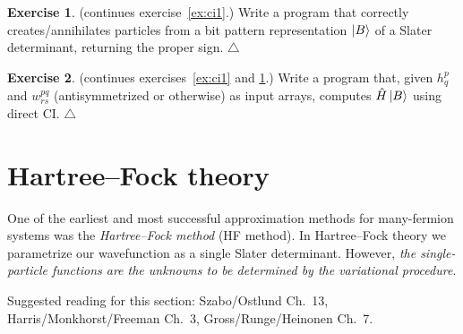 \documentclass{report}
\theoremstyle{plain}
\theoremstyle{definition}
\newtheorem{exerc}{Exercise}[chapter]
\newcommand\xqed[1]{%
  \leavevmode\unskip\penalty9999 \hbox{}\nobreak\hfill
  \quad\hbox{#1}}
\newcommand\demo{\xqed{$\triangle$}}
\newenvironment{exercise}{\bigskip\begin{exerc}}{\demo\end{exerc}\bigskip}
\begin{document}
\begin{exercise}\label{ex:ci2} (continues exercise~\ref{ex:ci1}.)
  Write a program that correctly creates/annihilates particles from a
  bit pattern representation $\ket{B}$ of a Slater determinant,
  returning the proper sign.
\end{exercise}

\begin{exercise}\label{ex:ci3} (continues exercises~\ref{ex:ci1} and \ref{ex:ci2}.)
  Write a program that, given $h^{p}_q$ and $w^{pq}_{rs}$
  (antisymmetrized or otherwise) as input
  arrays, computes $\hat{H}\ket{B}$ using direct CI.
\end{exercise}



\section{Hartree--Fock theory}

One of the earliest and most successful approximation methods for
many-fermion systems was the \emph{Hartree--Fock method} (HF method). In
Hartree--Fock theory we parametrize our wavefunction as a single Slater
determinant. However, \emph{the single-particle functions are the
  unknowns to be determined by the variational procedure}.

Suggested reading for this section: Szabo/Ostlund Ch.~13,
Harris/Monkhorst/Freeman Ch.~3, Gross/Runge/Heinonen Ch.~7.
\end{document}
